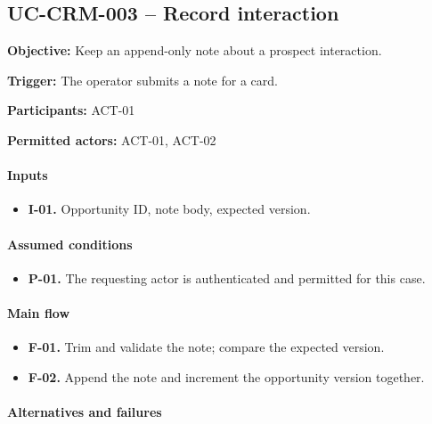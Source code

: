 \documentclass[10pt,a4paper]{article}
\begin{document}
\subsection{UC-CRM-003 -- Record interaction}

\textbf{Objective:} Keep an append-only note about a prospect interaction.

\textbf{Trigger:} The operator submits a note for a card.

\textbf{Participants:} ACT-01

\textbf{Permitted actors:} ACT-01, ACT-02

\paragraph{Inputs}

\begin{itemize}

\item \textbf{I-01.} Opportunity ID, note body, expected version.

\end{itemize}

\paragraph{Assumed conditions}

\begin{itemize}

\item \textbf{P-01.} The requesting actor is authenticated and permitted for this case.

\end{itemize}

\paragraph{Main flow}

\begin{itemize}

\item \textbf{F-01.} Trim and validate the note; compare the expected version.

\item \textbf{F-02.} Append the note and increment the opportunity version together.

\end{itemize}

\paragraph{Alternatives and failures}
\end{document}
